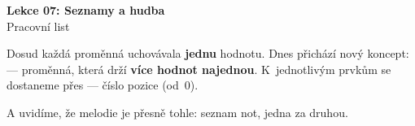 \newcommand{\lekce}{Lekce 07 -- Pracovní list}




\begin{center}
  {\Large\bfseries\textcolor{microbit-blue}{Lekce 07: Seznamy a hudba}}\\[4pt]
  {\large Pracovní list}
\end{center}

\medskip\noindent
Dosud každá proměnná uchovávala \textbf{jednu} hodnotu.
Dnes přichází nový koncept:  — proměnná, která drží
\textbf{více hodnot najednou}.
K~jednotlivým prvkům se dostaneme přes  — číslo pozice (od~0).

\medskip\noindent
A uvidíme, že melodie je přesně tohle: seznam not, jedna za druhou.


